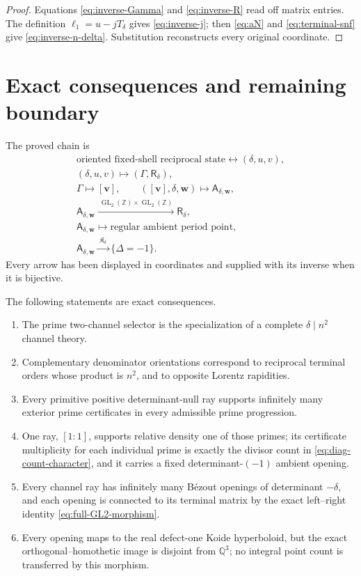 \documentclass[11pt]{article}
\theoremstyle{definition}
\theoremstyle{remark}
\newcommand{\Z}{\mathbb Z}
\newcommand{\GL}{\operatorname{GL}}
\newcommand{\1}{\mathbf 1}
\begin{document}
\begin{proof}
Equations \eqref{eq:inverse-Gamma} and \eqref{eq:inverse-R} read off matrix
entries.  The definition $\ell_1=u-jT_\delta$ gives
\eqref{eq:inverse-j}; then \eqref{eq:aN} and
\eqref{eq:terminal-snf} give \eqref{eq:inverse-n-delta}.  Substitution
reconstructs every original coordinate.
\end{proof}

\section{Exact consequences and remaining boundary}

The proved chain is
\begin{equation}\label{eq:full-chain}
 \boxed{
 \begin{gathered}
 \text{oriented fixed-shell reciprocal state}
 \longleftrightarrow
 (\delta,u,v),\\
 (\delta,u,v)
 \longmapsto
 \left(\Gamma,\mathsf R_\delta\right),\\
 \Gamma\longmapsto[\mathbf v],
 \qquad
 ([\mathbf v],\delta,\mathbf w)
 \longmapsto\mathsf A_{\delta,\mathbf w},\\
 \mathsf A_{\delta,\mathbf w}
 \xrightarrow{\ \GL_2(\Z)\times\GL_2(\Z)\ }
 \mathsf R_\delta,\\
 \mathsf A_{\delta,\mathbf w}
 \longmapsto
 \text{regular ambient period point},\\
 \mathsf A_{\delta,\mathbf w}
 \xrightarrow{\ \mathfrak K_\delta\ }
 \{\Delta=-1\}.
 \end{gathered}}
\end{equation}
Every arrow has been displayed in coordinates and supplied with its inverse
when it is bijective.

The following statements are exact consequences.
\begin{enumerate}[label=\textup{(\roman*)}]
\item The prime two-channel selector is the specialization of a complete
$\delta\mid n^2$ channel theory.
\item Complementary denominator orientations correspond to reciprocal
terminal orders whose product is $n^2$, and to opposite Lorentz rapidities.
\item Every primitive positive determinant-null ray supports infinitely many
exterior prime certificates in every admissible prime progression.
\item One ray, $[1:1]$, supports relative density one of those primes; its
certificate multiplicity for each individual prime is exactly the divisor
count in \eqref{eq:diag-count-character}, and it carries a fixed
determinant-$(-1)$ ambient opening.
\item Every channel ray has infinitely many Bézout openings of determinant
$-\delta$, and each opening is connected to its terminal matrix by the exact
left--right identity \eqref{eq:full-GL2-morphism}.
\item Every opening maps to the real defect-one Koide hyperboloid, but the exact
orthogonal--homothetic image is disjoint from $\mathbb Q^3$; no integral point
count is transferred by this morphism.
\end{enumerate}
\end{document}
